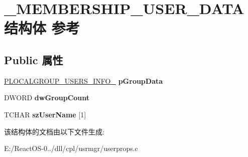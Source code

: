 \hypertarget{struct___m_e_m_b_e_r_s_h_i_p___u_s_e_r___d_a_t_a}{}\section{\+\_\+\+M\+E\+M\+B\+E\+R\+S\+H\+I\+P\+\_\+\+U\+S\+E\+R\+\_\+\+D\+A\+T\+A结构体 参考}
\label{struct___m_e_m_b_e_r_s_h_i_p___u_s_e_r___d_a_t_a}
\subsection*{Public 属性}
\begin{DoxyCompactItemize}
\item 
\mbox{\label{struct___m_e_m_b_e_r_s_h_i_p___u_s_e_r___d_a_t_a_af7a4c23769305464c22a0967b404a629}} 
\hyperlink{struct___l_o_c_a_l_g_r_o_u_p___u_s_e_r_s___i_n_f_o__0}{P\+L\+O\+C\+A\+L\+G\+R\+O\+U\+P\+\_\+\+U\+S\+E\+R\+S\+\_\+\+I\+N\+F\+O\+\_} {\bfseries p\+Group\+Data}
\item 
\mbox{\label{struct___m_e_m_b_e_r_s_h_i_p___u_s_e_r___d_a_t_a_a6e9de4fedc7c66bfca928255ab40fbf8}} 
D\+W\+O\+RD {\bfseries dw\+Group\+Count}
\item 
\mbox{\label{struct___m_e_m_b_e_r_s_h_i_p___u_s_e_r___d_a_t_a_ac9c45cd1d9ce32a8f05307dffa43ab1d}} 
T\+C\+H\+AR {\bfseries sz\+User\+Name} \mbox{[}1\mbox{]}
\end{DoxyCompactItemize}


该结构体的文档由以下文件生成\+:\begin{DoxyCompactItemize}
\item 
E\+:/\+React\+O\+S-\/0../dll/cpl/usrmgr/userprops.\+c\end{DoxyCompactItemize}
